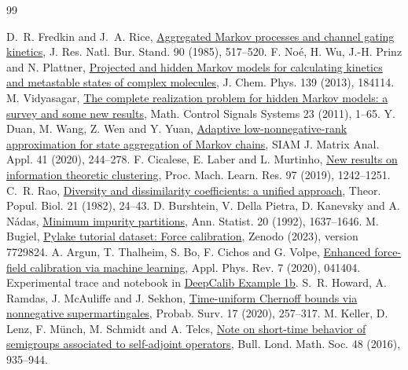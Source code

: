 \documentclass[11pt]{article}
\begin{document}
\begin{thebibliography}{99}
\small\raggedright\setlength{\itemsep}{2pt}
 D.~R. Fredkin and J.~A. Rice, \href{https://nvlpubs.nist.gov/nistpubs/jres/090/jresv90n6p517_A1b.pdf}{Aggregated Markov processes and channel gating kinetics}, J. Res. Natl. Bur. Stand. 90 (1985), 517--520.
 F. No\'e, H. Wu, J.-H. Prinz and N. Plattner, \href{https://arxiv.org/abs/1309.3220}{Projected and hidden Markov models for calculating kinetics and metastable states of complex molecules}, J. Chem. Phys. 139 (2013), 184114.
 M. Vidyasagar, \href{https://personal.utdallas.edu/~mxv091000/Research/hmm-full.pdf}{The complete realization problem for hidden Markov models: a survey and some new results}, Math. Control Signals Systems 23 (2011), 1--65.
 Y. Duan, M. Wang, Z. Wen and Y. Yuan, \href{https://doi.org/10.1137/18M1220790}{Adaptive low-nonnegative-rank approximation for state aggregation of Markov chains}, SIAM J. Matrix Anal. Appl. 41 (2020), 244--278.
 F. Cicalese, E. Laber and L. Murtinho, \href{https://proceedings.mlr.press/v97/cicalese19a.html}{New results on information theoretic clustering}, Proc. Mach. Learn. Res. 97 (2019), 1242--1251.
 C.~R. Rao, \href{https://doi.org/10.1016/0040-5809(82)90004-1}{Diversity and dissimilarity coefficients: a unified approach}, Theor. Popul. Biol. 21 (1982), 24--43.
 D. Burshtein, V. Della Pietra, D. Kanevsky and A. N\'adas, \href{https://doi.org/10.1214/aos/1176348789}{Minimum impurity partitions}, Ann. Statist. 20 (1992), 1637--1646.
 M. Bugiel, \href{https://doi.org/10.5281/zenodo.7729824}{Pylake tutorial dataset: Force calibration}, Zenodo (2023), version 7729824.
 A. Argun, T. Thalheim, S. Bo, F. Cichos and G. Volpe, \href{https://arxiv.org/abs/2006.08963}{Enhanced force-field calibration via machine learning}, Appl. Phys. Rev. 7 (2020), 041404. Experimental trace and notebook in \href{https://github.com/softmatterlab/DeepCalib/tree/bea01cc09413d9a19c5e23aad9e594fe879fea61}{DeepCalib Example 1b}.
 S.~R. Howard, A. Ramdas, J. McAuliffe and J. Sekhon, \href{https://doi.org/10.1214/18-PS321}{Time-uniform Chernoff bounds via nonnegative supermartingales}, Probab. Surv. 17 (2020), 257--317.
 M. Keller, D. Lenz, F. M\"unch, M. Schmidt and A. Telcs, \href{https://doi.org/10.1112/blms/bdw054}{Note on short-time behavior of semigroups associated to self-adjoint operators}, Bull. Lond. Math. Soc. 48 (2016), 935--944.
\end{thebibliography}
\end{document}
